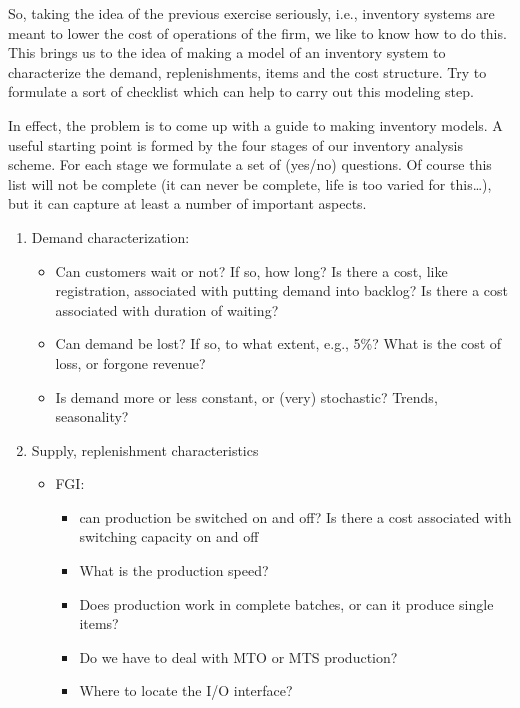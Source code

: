 \begin{question}
  So, taking the idea of the previous exercise seriously, i.e.,
  inventory systems are meant to lower the cost of operations of the
  firm, we like to know how to do this. This brings us to the idea of
  making a model of an inventory system to characterize the demand,
  replenishments, items and the cost structure. Try to formulate a
  sort of checklist which can help to carry out this modeling step.
  \begin{solution}
    In effect, the problem is to come up with a guide to making
    inventory models.  A useful starting point is formed by the four
    stages of our inventory analysis scheme.  For each stage we
    formulate a set of (yes/no) questions. Of course this list will not
    be complete (it can never be complete, life is too varied for
    this\ldots), but it can capture at least a number of important aspects.
    \begin{enumerate}
    \item Demand characterization:
      \begin{itemize}
      \item Can customers wait or not?  If so, how long? Is there a
        cost, like registration, associated with putting demand into
        backlog? Is there a cost associated with duration of waiting?
      \item Can demand be lost? If so, to what extent, e.g., 5\%? What
        is the cost of loss, or forgone revenue?
      \item Is demand more or less constant, or (very) stochastic? Trends, seasonality?
      \end{itemize}
    \item Supply, replenishment characteristics
      \begin{itemize}
      \item FGI:
      \begin{itemize}
      \item can production be switched on and off?  Is there a cost
        associated with switching capacity on and off
      \item What is the production speed?
      \item Does production work in complete batches, or can it produce single items?
      \item Do we have to deal with MTO or MTS production? 
      \item Where to locate the I/O interface?
      \end{itemize}

\end{itemize}
\end{enumerate}
\end{solution}
\end{question}

